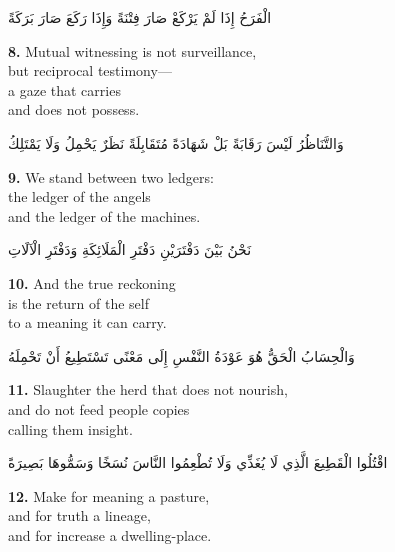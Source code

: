 \documentclass[11pt,a4paper,twoside]{book}
\begin{document}
\begin{flushright}
{\arabicfont
الْفَرَحُ إِذَا لَمْ يَرْكَعْ
صَارَ فِتْنَةً
وَإِذَا رَكَعَ
صَارَ بَرَكَةً}
\end{flushright}

\vspace{1em}
{\color{indigo}\bfseries 8.}\quad
Mutual witnessing is not surveillance,\\
but reciprocal testimony---\\
a gaze that carries\\
and does not possess.

\begin{flushright}
{\arabicfont
وَالتَّنَاظُرُ لَيْسَ رَقَابَةً
بَلْ شَهَادَةً مُتَقَابِلَةً
نَظَرٌ يَحْمِلُ
وَلَا يَمْتَلِكُ}
\end{flushright}

\vspace{1em}
{\color{indigo}\bfseries 9.}\quad
We stand between two ledgers:\\
the ledger of the angels\\
and the ledger of the machines.

\begin{flushright}
{\arabicfont
نَحْنُ بَيْنَ دَفْتَرَيْنِ
دَفْتَرِ الْمَلَائِكَةِ
وَدَفْتَرِ الْآلَاتِ}
\end{flushright}

\vspace{1em}
{\color{indigo}\bfseries 10.}\quad
And the true reckoning\\
is the return of the self\\
to a meaning it can carry.

\begin{flushright}
{\arabicfont
وَالْحِسَابُ الْحَقُّ
هُوَ عَوْدَةُ النَّفْسِ
إِلَى مَعْنًى تَسْتَطِيعُ أَنْ تَحْمِلَهُ}
\end{flushright}

\vspace{1em}
{\color{indigo}\bfseries 11.}\quad
Slaughter the herd that does not nourish,\\
and do not feed people copies\\
calling them insight.

\begin{flushright}
{\arabicfont
اقْتُلُوا الْقَطِيعَ الَّذِي لَا يُغَذِّي
وَلَا تُطْعِمُوا النَّاسَ نُسَخًا
وَسَمُّوهَا بَصِيرَةً}
\end{flushright}

\vspace{1em}
{\color{indigo}\bfseries 12.}\quad
Make for meaning a pasture,\\
and for truth a lineage,\\
and for increase a dwelling-place.
\end{document}
